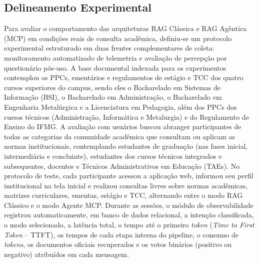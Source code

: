 \documentclass[12pt]{article}
\begin{document}
\subsection{Delineamento Experimental}
Para avaliar o comportamento das arquiteturas RAG Clássica e RAG Agêntica (MCP) em condições reais de consulta acadêmica, definiu-se um protocolo experimental estruturado em duas frentes complementares de coleta: monitoramento automatizado de telemetria e avaliação de percepção por questionário pós-uso. A base documental indexada para os experimentos contemplou os PPCs, ementários e regulamentos de estágio e TCC dos quatro cursos superiores do campus, sendo eles o Bacharelado em Sistemas de Informação (BSI), o Bacharelado em Administração, o Bacharelado em Engenharia Metalúrgica e a Licenciatura em Pedagogia, além dos PPCs dos cursos técnicos (Administração, Informática e Metalurgia) e do Regulamento de Ensino do IFMG.
A avaliação com usuários buscou abranger participantes de todas as categorias da comunidade acadêmica que consultam ou aplicam as normas institucionais, contemplando estudantes de graduação (nas fases inicial, intermediária e concluinte), estudantes dos cursos técnicos integrados e subsequentes, docentes e Técnicos Administrativos em Educação (TAEs). No protocolo de teste, cada participante acessou a aplicação web, informou seu perfil institucional na tela inicial e realizou consultas livres sobre normas acadêmicas, matrizes curriculares, ementas, estágio e TCC, alternando entre o modo RAG Clássico e o modo Agente MCP. Durante as sessões, o módulo de observabilidade registrou automaticamente, em banco de dados relacional, a intenção classificada, o modo selecionado, a latência total, o tempo até o primeiro \textit{token} (\textit{Time to First Token} -- TTFT), os tempos de cada etapa interna do pipeline, o consumo de \textit{tokens}, os documentos oficiais recuperados e os votos binários (positivo ou negativo) atribuídos em cada mensagem.


\end{document}
